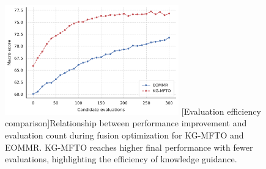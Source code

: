 \documentclass[../main.tex]{subfiles}
\begin{document}
\begin{figure}
	\centering
	\includegraphics[width=0.67\textwidth]{KG-MFTO/figure3a_convergence_vs_evals.pdf}
	[Evaluation efficiency comparison]{Relationship between performance improvement and evaluation count during fusion optimization for KG-MFTO and EOMMR. KG-MFTO reaches higher final performance with fewer evaluations, highlighting the efficiency of knowledge guidance.}
	\label{fig:perf-vs-eval-count}
\end{figure}
\end{document}
